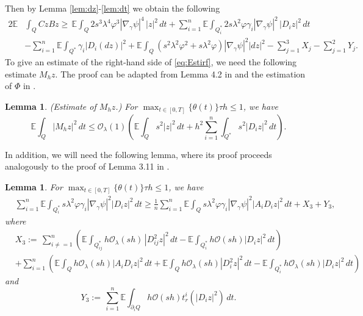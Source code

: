 \documentclass[11pt,oneside,leqno]{amsart}
\numberwithin{equation}{section}
\numberwithin{equation}{section}
\newcommand{\E}{\mathbb{E}}
\newtheorem{lemma}[theorem]{Lemma}
\begin{document}
Then by Lemma \ref{lem:dz}-\ref{lem:dt} we obtain the following
\begin{equation}\label{eq:sumterms}
\begin{split}
    2\E &\int_Q CzBz \geq\,\E\int_{Q}2s^{3}\lambda^{4}\varphi^{3}|\nabla_{\gamma}\psi|^{4}\,|z|^{2}\,dt+ \sum_{i=1}^{n}\E\int_{Q_{i}^{\ast}}2s\lambda^{2}\varphi\gamma_i|\nabla_{\gamma}\psi|^{2}\,|D_{i}z|^{2}\,dt\\
    &-\sum_{i=1}^{n} \E\int_{Q^{\ast}}\gamma_i |D_i(dz)|^2+\E\int_{Q}(s^2\lambda^2\varphi^2+s\lambda^2\varphi)|\nabla_{\gamma} \psi|^2|dz|^2-\sum_{j=1}^{3}X_{j}-\sum_{j=1}^2 Y_j.
    \end{split}
\end{equation}
To give an estimate of the right-hand side of \eqref{eq:Estirf}, we need the following estimate $M_hz$. The proof can be adapted from Lemma 4.2 in  \cite{boyer-2010-1d-elliptic} and the estimation of $\Phi$ in \cite{zhao:2024}.
\begin{lemma}\label{lem:estimate:termsMh}
(\textit{Estimate of $M_hz$.)} For $\displaystyle \max_{t\in[0,T]}\{\theta(t)\}\tau h\leq 1$, we have
\begin{equation*}
    \E\int_{Q}|M_hz|^2\,dt\leq \mathcal{O}_{\lambda}(1)\left(\E\int_{Q}s^2|z|^2\,dt+h^2\sum_{i=1}^{n}\int_{Q^{\ast}}s^2|D_iz|^2\,dt\right).
\end{equation*}
\end{lemma}
In addition, we will need the following lemma, where its proof proceeds analogously to the proof of Lemma 3.11 in \cite{boyer-2014}.
\begin{lemma}\label{lem:inequalityforDz}
    For $\displaystyle \max_{t\in[0,T]}\{\theta(t)\}\tau h\leq 1$, we have
    \begin{equation*}
         \begin{split}
        &\sum_{i=1}^{n} \E\int_{Q_i^{\ast}} s\lambda^2\varphi \gamma_i |\nabla_{\gamma}\psi|^2|D_iz|^2\,dt\geq\frac{1}{n}\sum_{i=1}^{n}\E\int_{Q} s\lambda^2\varphi \gamma_i|\nabla_{\gamma}\psi|^2|A_iD_iz|^2\,dt+X_3+Y_3,
    \end{split}
    \end{equation*}
 where 
 \begin{equation*}
     \begin{split}
         &X_3:=\, \sum_{i\ne =1}^{n}\left(\E\int_{Q_{ij}^{\ast}}h\mathcal{O}_{\lambda}(sh)\,|D^2_{ij}z|^2\,dt-\E\int_{Q_{i}^{\ast}}h\mathcal{O}(sh)|D_iz|^2\,dt\right)\\
        &+\sum_{i=1}^{n}\left(\E\int_{Q} h\mathcal{O}_{\lambda}(sh)|A_iD_iz|^2\,dt+\E\int_{Q} h\mathcal{O}_{\lambda}(sh)|D^2_iz|^2\,dt-\E\int_{Q_i^{\ast}} h\mathcal{O}_{\lambda}(sh)|D_iz|^2\,dt\right)
     \end{split}
 \end{equation*}
 and
 \begin{equation*}
     Y_3:=\, \sum_{i=1}^{n}\E\int_{\partial_iQ} h\mathcal{O}(sh)t_r^i(|D_iz|^2)\,dt.
 \end{equation*}
\end{lemma}
\end{document}
